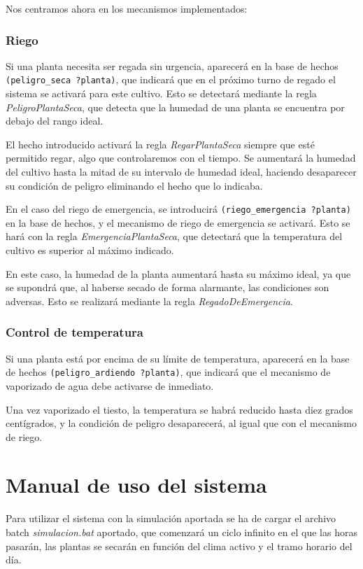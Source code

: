 \documentclass[11pt,a4paper]{article}
\begin{document}
Nos centramos ahora en los mecanismos implementados:

\subsubsection*{Riego}
Si una planta necesita ser regada sin urgencia, aparecerá en la base de hechos \texttt{(peligro\_seca ?planta)}, que indicará que en el próximo turno de regado el sistema se activará para este cultivo. Esto se detectará mediante la regla \textit{PeligroPlantaSeca}, que detecta que la humedad de una planta se encuentra por debajo del rango ideal.

El hecho introducido activará la regla \textit{RegarPlantaSeca} siempre que esté permitido regar, algo que controlaremos con el tiempo. Se aumentará la humedad del cultivo hasta la mitad de su intervalo de humedad ideal, haciendo desaparecer su condición de peligro eliminando el hecho que lo indicaba.


\medskip

En el caso del riego de emergencia, se introducirá \texttt{(riego\_emergencia ?planta)} en la base de hechos, y el mecanismo de riego de emergencia se activará. Esto se hará con la regla \textit{EmergenciaPlantaSeca}, que detectará que la temperatura del cultivo es superior al máximo indicado.

En este caso, la humedad de la planta aumentará hasta su máximo ideal, ya que se supondrá que, al haberse secado de forma alarmante, las condiciones son adversas. Esto se realizará mediante la regla \textit{RegadoDeEmergencia}.

\subsubsection*{Control de temperatura}
Si una planta está por encima de su límite de temperatura, aparecerá en la base de hechos \texttt{(peligro\_ardiendo ?planta)}, que indicará que el mecanismo de vaporizado de agua debe activarse de inmediato.

Una vez vaporizado el tiesto, la temperatura se habrá reducido hasta diez grados centígrados, y la condición de peligro desaparecerá, al igual que con el mecanismo de riego.

\section{Manual de uso del sistema}
Para utilizar el sistema con la simulación aportada se ha de cargar el archivo batch \textit{simulacion.bat} aportado, que comenzará un ciclo infinito en el que las horas pasarán, las plantas se secarán en función del clima activo y el tramo horario del día.
\end{document}
